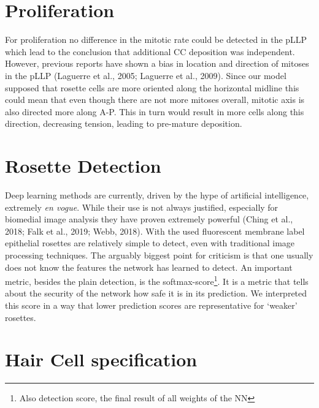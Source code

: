 \documentclass[11pt,singlespacinge,twoside]{reedthesis} %
\begin{document}
\hypertarget{proliferation-1}{%
\section{Proliferation}\label{proliferation-1}}

For proliferation no difference in the mitotic rate could be detected in the pLLP which lead to the conclusion that additional CC deposition was independent. However, previous reports have shown a bias in location and direction of mitoses in the pLLP (Laguerre et al., 2005; Laguerre et al., 2009). Since our model supposed that rosette cells are more oriented along the horizontal midline this could mean that even though there are not more mitoses overall, mitotic axis is also directed more along A-P. This in turn would result in more cells along this direction, decreasing tension, leading to pre-mature deposition.

\hypertarget{rosette-detection}{%
\section{Rosette Detection}\label{rosette-detection}}

Deep learning methods are currently, driven by the hype of artificial intelligence, extremely \emph{en vogue}. While their use is not always justified, especially for biomedial image analysis they have proven extremely powerful (Ching et al., 2018; Falk et al., 2019; Webb, 2018). With the used fluorescent membrane label epithelial rosettes are relatively simple to detect, even with traditional image processing techniques. The arguably biggest point for criticism is that one usually does not know the features the network has learned to detect. An important metric, besides the plain detection, is the softmax-score\footnote{Also detection score, the final result of all weights of the NN}. It is a metric that tells about the security of the network how safe it is in its prediction. We interpreted this score in a way that lower prediction scores are representative for `weaker' rosettes.

\hypertarget{hair-cell-specification-1}{%
\section{Hair Cell specification}\label{hair-cell-specification-1}}
\end{document}
